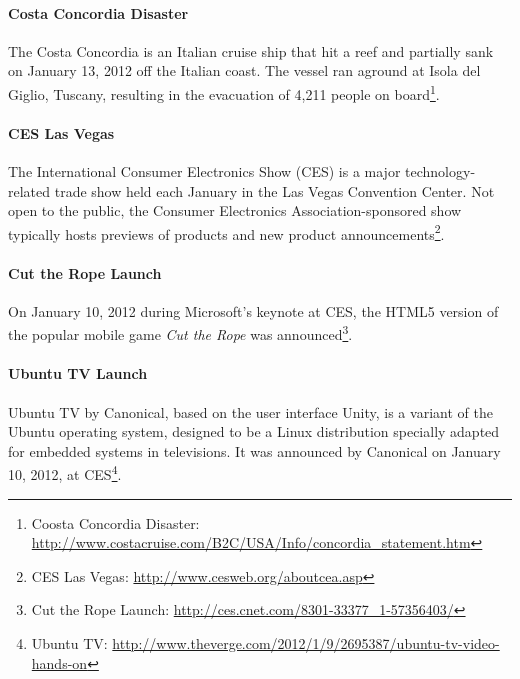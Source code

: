 \documentclass{acm_proc_article-sp}
\newcommand{\inlinelistingsize}{\fontsize{8pt}{11pt}}
\let\oldurl\url
\renewcommand{\url}[1]{\inlinelistingsize\oldurl{#1}}
\begin{document}
\paragraph{Costa Concordia Disaster}
The Costa Concordia is an Italian cruise ship that hit a reef and partially sank on January 13, 2012 off the Italian coast.
The vessel ran aground at Isola del Giglio, Tuscany, resulting in the evacuation of 4,211 people on board\footnote{Coosta Concordia Disaster: \url{http://www.costacruise.com/B2C/USA/Info/concordia_statement.htm}}.

\paragraph{CES Las Vegas}
The International Consumer Electronics Show (CES) is a major technology-related trade show held each January in the Las Vegas Convention Center.
Not open to the public, the Consumer Electronics Association-sponsored show typically hosts previews of products and new product announcements\footnote{CES Las Vegas: \url{http://www.cesweb.org/aboutcea.asp}}.

\paragraph{Cut the Rope Launch}
On January 10, 2012 during Microsoft's keynote at CES, the HTML5 version of the popular mobile game \textit{Cut the Rope} was announced\footnote{Cut the Rope Launch: \url{http://ces.cnet.com/8301-33377_1-57356403/}}.

\paragraph{Ubuntu TV Launch}
Ubuntu TV by Canonical, based on the user interface Unity, is a variant of the Ubuntu operating system, designed to be a Linux distribution specially adapted for embedded systems in televisions. It was announced by Canonical on January 10, 2012, at CES\footnote{Ubuntu TV: \url{http://www.theverge.com/2012/1/9/2695387/ubuntu-tv-video-hands-on}}.
\end{document}
